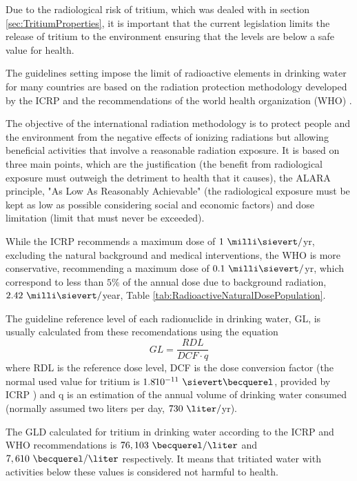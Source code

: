 Due to the radiological risk of tritium, which was dealed with in section \ref{sec:TritiumProperties}, it is important that the current legislation limits the release of tritium to the environment ensuring that the levels are below a safe value for health.

The guidelines setting impose the limit of radioactive elements in drinking water for many countries are based on the radiation protection methodology developed by the ICRP \cite{ICRP_GL} and the recommendations of the world health organization (WHO) \cite{WHO_GL}.

The objective of the international radiation methodology is to  protect people and the environment from the negative effects of ionizing radiations but allowing beneficial activities that involve a reasonable radiation exposure. It is based on three main points, which are the justification (the benefit from radiological exposure must outweigh the detriment to health that it causes), the ALARA principle, "As Low As Reasonably Achievable" (the radiological exposure must be kept as low as possible considering social and economic factors) and dose limitation (limit that must never be exceeded).

While the ICRP recommends a maximum dose of $1~\milli\sievert/$yr, excluding the natural background and medical interventions, the WHO is more conservative, recommending a maximum dose of $0.1~\milli\sievert/$yr, which correspond to less than $5\%$ of the annual dose due to background radiation, $2.42~\milli\sievert/$year, Table \ref{tab:RadioactiveNaturalDosePopulation}.

The guideline reference level of each radionuclide in drinking water, GL, is usually calculated from these recomendations using the equation
\begin{equation}
GL = \frac{RDL}{DCF \cdot{} q}
\label{eq:Guideline}
\end{equation}
where RDL is the reference dose level, DCF is the dose conversion factor (the normal used value for tritium is $1.8 \dot{} 10^{-11}~\sievert\becquerel$, provided by ICRP \cite{ICRP_factor}) and q is an estimation of the annual volume of drinking water consumed (normally assumed two liters per day, $730~\liter/$yr).

The GLD calculated for tritium in drinking water according to the ICRP and WHO recommendations is $76,103~\becquerel/\liter$ and $7,610~\becquerel/\liter$  respectively. It means that tritiated water with activities below these values is considered not harmful to health.


